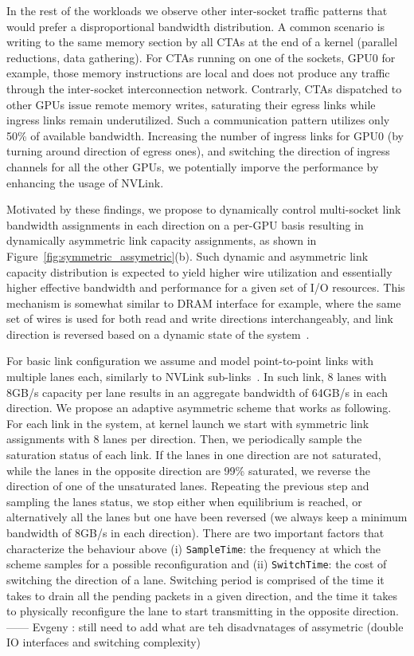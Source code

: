 In the rest of the workloads we observe other inter-socket traffic patterns 
that would prefer a disproportional bandwidth distribution. A common scenario 
is writing to the same memory section by all CTAs at the end of a kernel 
(parallel reductions, data gathering). For CTAs running on one of the sockets, 
GPU0 for example, those memory instructions are local and does not produce 
any traffic through the inter-socket interconnection network. Contrarly, 
CTAs dispatched to other GPUs issue remote memory writes, saturating their 
egress links while ingress links remain underutilized. Such a communication 
pattern utilizes only 50\% of available bandwidth. Increasing the number of 
ingress links for GPU0 (by turning around direction of egress ones), and 
switching the direction of ingress channels for all the other GPUs, we 
potentially imporve the performance by enhancing the usage of NVLink. 

Motivated by these findings, we propose to dynamically control multi-socket
link bandwidth assignments in each direction on a per-GPU basis resulting in
dynamically asymmetric link capacity assignments, as shown in
Figure~\ref{fig:symmetric_assymetric}(b). Such dynamic and asymmetric link
capacity distribution is expected to yield higher wire utilization and
essentially higher effective bandwidth and performance for a given set of I/O
resources. This mechanism is somewhat similar to DRAM interface for example,
where the same set of wires is used for both read and write directions
interchangeably, and link direction is reversed based on a dynamic state of the
system~\cite{}. 

For basic link configuration we assume and model point-to-point
links with multiple lanes each, similarly to NVLink
sub-links~\cite{pascal-tesla-wp}.  In such link, 8 lanes with 8GB/s capacity
per lane results in an aggregate bandwidth of 64GB/s in each direction. We
propose an adaptive asymmetric scheme that works as following. For each link
in the system, at kernel launch we start with symmetric link assignments with 8
lanes per direction. Then, we periodically sample the saturation
status of each link. If the lanes in one direction are not saturated, while the
lanes in the opposite direction are 99\% saturated, we reverse the direction of
one of the unsaturated lanes. Repeating the previous step and sampling the lanes
status, we stop either when equilibrium is reached, or alternatively all the 
lanes but one have been reversed (we always keep a minimum bandwidth of 8GB/s 
in each direction).  
There are two important factors that characterize the behaviour above (i) 
\texttt{SampleTime}: the frequency at which the scheme samples for a possible 
reconfiguration and (ii) \texttt{SwitchTime}: the cost of switching the 
direction of a lane. Switching period is comprised of the time it takes to 
drain all the pending packets in a given direction, and the time it takes to 
physically reconfigure the lane to start transmitting in the opposite 
direction. 
------  Evgeny : still need to add what are teh disadvnatages of assymetric
(double IO interfaces and switching complexity)

